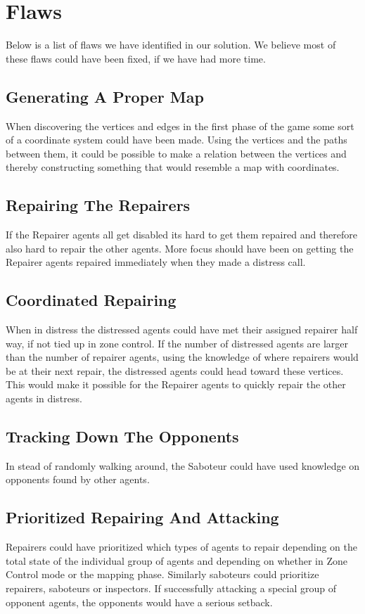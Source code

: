 \documentclass[11pt]{article}
\begin{document}
\section{Flaws}
Below is a list of flaws we have identified in our solution. We believe most of these flaws could have been fixed, if we have had more time.

\subsection{Generating A Proper Map}
When discovering the vertices and edges in the first phase of the game some sort of a coordinate system could have been made. Using the vertices and the paths between them, it could be possible to make a relation between the vertices and thereby constructing something that would resemble a map with coordinates.

\subsection{Repairing The Repairers}
If the Repairer agents all get disabled its hard to get them repaired and therefore also hard to repair the other agents. More focus should have been on getting the Repairer agents repaired immediately when they made a distress call.

\subsection{Coordinated Repairing}
When in distress the distressed agents could have met their assigned repairer half way, if not tied up in zone control. If the number of distressed agents are larger than the number of repairer agents, using the knowledge of where repairers would be at their next repair, the distressed agents could head toward these vertices. This would make it possible for the Repairer agents to quickly repair the other agents in distress.

\subsection{Tracking Down The Opponents}
In stead of randomly walking around, the Saboteur could have used knowledge on opponents found by other agents.

\subsection{Prioritized Repairing And Attacking}
Repairers could have prioritized which types of agents to repair  depending on the total state of the individual group of agents and depending on whether in Zone Control mode or the mapping phase. Similarly saboteurs could prioritize repairers, saboteurs or inspectors. If successfully attacking a special group of opponent agents, the opponents would have a serious setback.
\end{document}
